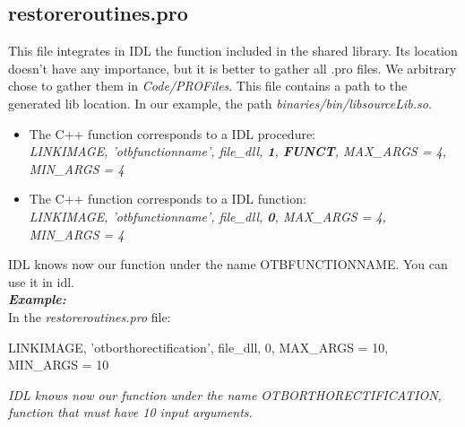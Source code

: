 \subsection{restoreroutines.pro}
This file integrates in IDL the function included in the shared library. Its location doesn't have any importance, but it is better to gather all .pro files.
We arbitrary chose to gather them in \emph{Code/PROFiles}.
This file contains a path to the generated lib location. In our example, the path \emph{binaries/bin/libsourceLib.so}.
\begin{itemize}
\item The C++ function corresponds to a IDL procedure:\\
  \emph{LINKIMAGE, 'otbfunctionname', file\_dll, \textbf{1}, \textbf{\/FUNCT}, MAX\_ARGS = 4, MIN\_ARGS = 4}
\item The C++ function corresponds to a IDL function:\\
  \emph{LINKIMAGE, 'otbfunctionname', file\_dll, \textbf{0}, MAX\_ARGS = 4, MIN\_ARGS = 4}
\end{itemize}
IDL knows now our function under the name OTBFUNCTIONNAME. You can use it in idl.\\

\emph{\textbf{Example:}}\\
\indent In the \emph{restoreroutines.pro} file:\\
\begin{scriptsize}
\indent LINKIMAGE, 'otborthorectification', file\_dll, 0, MAX\_ARGS = 10, MIN\_ARGS = 10\\
\end{scriptsize}
\indent \emph{IDL knows now our function under the name OTBORTHORECTIFICATION, function that must have 10 input arguments.}\\




